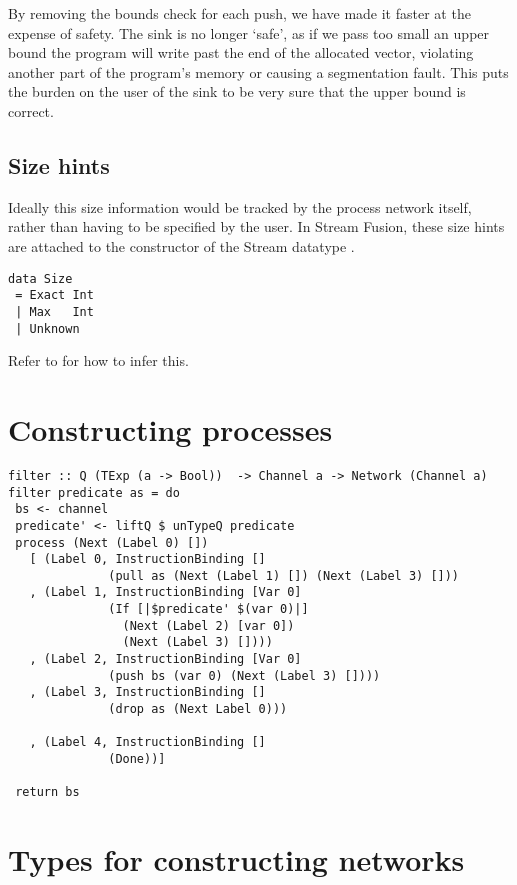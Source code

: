 By removing the bounds check for each push, we have made it faster at the expense of safety.
The sink is no longer `safe', as if we pass too small an upper bound the program will write past the end of the allocated vector, violating another part of the program's memory or causing a segmentation fault.
This puts the burden on the user of the sink to be very sure that the upper bound is correct.

\subsection{Size hints}
\label{s:implementation:sizehints}

Ideally this size information would be tracked by the process network itself, rather than having to be specified by the user.
In Stream Fusion, these size hints are attached to the constructor of the Stream datatype \cite{coutts2007rewriting}.

\begin{lstlisting}
data Size
 = Exact Int
 | Max   Int
 | Unknown
\end{lstlisting}

Refer to  for how to infer this.


\section{Constructing processes}
\begin{lstlisting}
filter :: Q (TExp (a -> Bool))  -> Channel a -> Network (Channel a)
filter predicate as = do
 bs <- channel
 predicate' <- liftQ $ unTypeQ predicate
 process (Next (Label 0) [])
   [ (Label 0, InstructionBinding []
              (pull as (Next (Label 1) []) (Next (Label 3) []))
   , (Label 1, InstructionBinding [Var 0]
              (If [|$predicate' $(var 0)|]
                (Next (Label 2) [var 0])
                (Next (Label 3) [])))
   , (Label 2, InstructionBinding [Var 0]
              (push bs (var 0) (Next (Label 3) [])))
   , (Label 3, InstructionBinding []
              (drop as (Next Label 0)))

   , (Label 4, InstructionBinding []
              (Done))]

 return bs
\end{lstlisting}

\section{Types for constructing networks}

